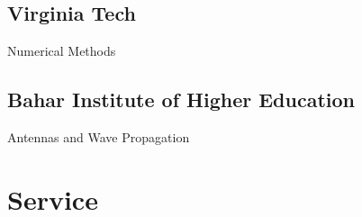\documentclass[11pt,letterpaper]{report}
\newcommand{\listitemspace}{0.25em}
\renewenvironment{itemize}
{\begin{list}{}{\setlength{\leftmargin}{0em}
                \setlength{\parskip}{0em}
                \setlength{\itemsep}{\listitemspace}
                \setlength{\parsep}{\listitemspace}}}
{\end{list}}
\begin{document}
    \subsection*{Virginia Tech}
    \begin{itemize}
        \item Numerical Methods
    \end{itemize}

    \subsection*{Bahar Institute of Higher Education}
    \begin{itemize}
        \item Antennas and Wave Propagation
    \end{itemize}

    \section*{Service}









\end{document}

